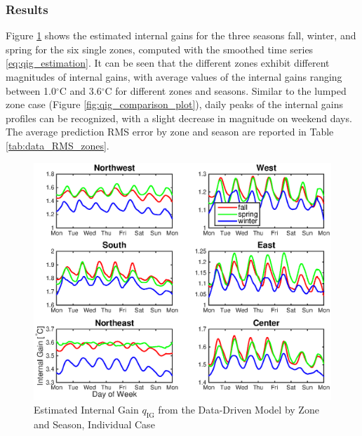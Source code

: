 \subsubsection{Results}
Figure \ref{fig:qig_seasons_indiv} shows the estimated internal gains for the three seasons fall, winter, and spring for the six single zones, computed with the smoothed time series \eqref{eq:qig_estimation}. It can be seen that the different zones exhibit different magnitudes of internal gains, with average values of the internal gains ranging between 1.0$^{\circ}$C and 3.6$^{\circ}$C for different zones and seasons. Similar to the lumped zone case (Figure \ref{fig:qig_comparison_plot}), daily peaks of the internal gains profiles can be recognized, with a slight decrease in magnitude on weekend days. The average prediction RMS error by zone and season are reported in Table \ref{tab:data_RMS_zones}.	

\begin{figure}[hbtp]
\centering
\vspace*{-0.2cm}
\includegraphics[scale=0.46]{chapters/building_model/figures/data_indiv_qig.eps}
\vspace*{-0.5cm}
\caption{Estimated Internal Gain $q_{\text{IG}}$ from the Data-Driven Model by Zone and Season, Individual Case}
\label{fig:qig_seasons_indiv}
\end{figure}

